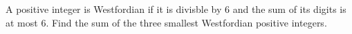 A positive integer is Westfordian if it is divisble by $6$ and the sum of its digits is at most $6$. Find the sum of the three smallest Westfordian positive integers.
